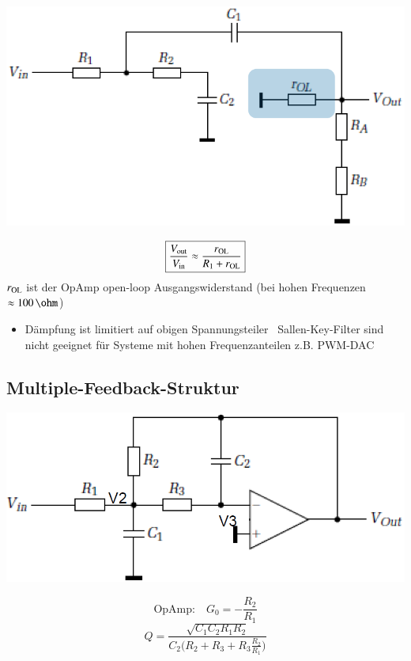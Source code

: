 \begin{minipage}[c]{0.4\columnwidth}  
    \includegraphics[width=\columnwidth]{images/sallen_key_hohe_frequenzen.png}
\end{minipage}
\hfill
\begin{minipage}[c]{0.58\columnwidth}
    $$ \boxed{ \frac{V_{\rm out}}{V_{\rm in}} \approx \frac{r_{\rm OL}}{R_1 + r_{\rm OL}} }$$
    $r_{\rm OL}$ ist der OpAmp open-loop Ausgangswiderstand (bei hohen Frequenzen $\approx 100 \, \ohm$)
\end{minipage}

\begin{itemize}
    \item Dämpfung ist limitiert auf obigen Spannungsteiler
        \textrightarrow\ Sallen-Key-Filter sind nicht geeignet für Systeme mit hohen Frequenzanteilen z.B. PWM-DAC
\end{itemize}


\subsection{Multiple-Feedback-Struktur}

\begin{minipage}[c]{0.4\columnwidth}
    \includegraphics[width=\columnwidth]{images/aktive_filter_multiple_feedback.png}
\end{minipage}
\hfill
\begin{minipage}[c]{0.58\columnwidth}
    $$ \text{OpAmp:} \quad  G_0 = -\frac{R_2}{R_1} $$
    $$ Q = \frac{\sqrt{C_1 C_2 R_1 R_2}}{ C_2 \Big( R_2 + R_3 + R_3 \frac{R_2}{R_1} \Big)} $$
\end{minipage}

